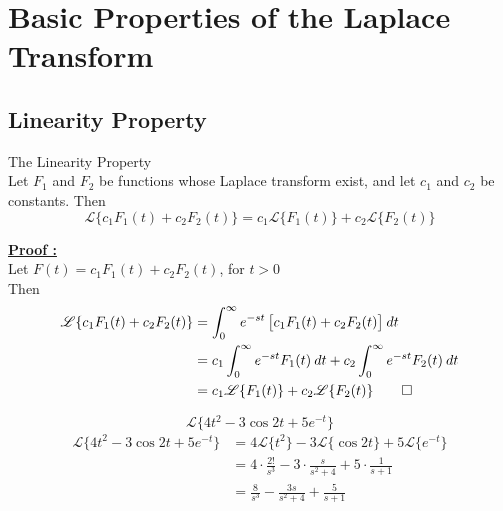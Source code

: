 \documentclass[12pt]{article}
\newcommand{\Lap}{\mathscr{L}}
\begin{document}
\vspace{30pt}
\section{Basic Properties of the Laplace Transform}

\subsection{Linearity Property}
\begin{theorem*}{The Linearity Property}{}
    \\Let $F_1$ and $F_2$ be functions whose Laplace transform exist, and let $c_1$ and $c_2$ be constants. Then
    \[
        \Lap \{ c_1F_1(t) + c_2F_2(t) \} = c_1 \Lap \{ F_1(t) \} + c_2 \Lap \{ F_2(t) \}
    \]
\end{theorem*}

\underline{\textbf{Proof :}}\\
Let $F(t) = c_1F_1(t) + c_2F_2(t)$, for $t>0$\\
Then\\
\begin{align*}
    \Lap \{ c_1F_1(t) + c_2F_2(t) \} &= \int_{0}^{\infty} { e^{-st} \left[ c_1F_1(t) + c_2F_2(t) \right] } \: d{t} \\
    &= c_1 \int_{0}^{\infty} { e^{-st} F_1(t) } \: d{t} + c_2 \int_{0}^{\infty} { e^{-st} F_2(t) } \: d{t} \\
    &= c_1 \Lap \{ F_1(t) \} + c_2 \Lap \{ F_2(t) \}\qed
\end{align*}

\begin{example}{
        $$ \Lap \{ 4t^2 - 3\cos{2t} + 5e^{-t} \} $$
    }{}
    \begin{align*}
        \Lap \{ 4t^2 - 3\cos{2t} + 5e^{-t} \} &= 4 \Lap \{ t^2 \} - 3 \Lap \{ \cos{2t} \} + 5 \Lap \{ e^{-t} \} \\
        &= 4 \cdot \frac{2!}{s^3} - 3 \cdot \frac{s}{s^2+4} + 5 \cdot \frac{1}{s+1} \\
        &= \frac{8}{s^3} - \frac{3s}{s^2+4} + \frac{5}{s+1}
    \end{align*}
\end{example}
\end{document}
